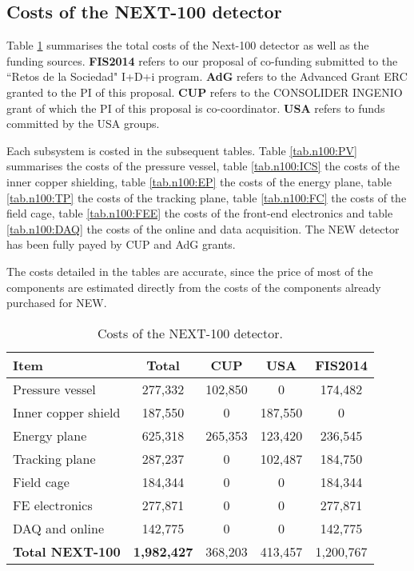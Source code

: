 \subsection{Costs of the NEXT-100 detector}
Table \ref{tab.n100:DET} summarises the total costs of the Next-100 detector as well as the funding sources. {\bf FIS2014} refers to our proposal of co-funding submitted to the ``Retos de la Sociedad" I+D+i program. {\bf AdG} refers to the Advanced Grant ERC granted to the PI of this proposal. {\bf CUP} refers to the CONSOLIDER INGENIO grant of which the PI of this proposal is co-coordinator. {\bf USA} refers to funds committed by the USA groups.

Each subsystem is costed in the subsequent tables. Table \ref{tab.n100:PV} summarises the costs of the pressure vessel, 
table \ref{tab.n100:ICS} the costs of the inner copper shielding,
table \ref{tab.n100:EP} the costs of the energy plane,
table \ref{tab.n100:TP} the costs of the tracking plane,
table \ref{tab.n100:FC} the costs of the field cage,
table \ref{tab.n100:FEE} the costs of the front-end electronics and
table \ref{tab.n100:DAQ} the costs of the online and data acquisition. The NEW detector has
been fully payed by CUP and AdG grants.

The costs detailed in the tables are  accurate, since the price of most of the components are estimated directly from the costs of the components already purchased for NEW. 
  
\begin{table}[h!]
\begin{center}
\begin{tabular}{|l|c|c|c|c|}
\hline
 Item &	Total& 	CUP & USA & FIS2014 \\
 \hline
Pressure vessel &	277,332 & 102,850  & 0&	174,482  \\
Inner copper shield &	187,550 &	0 & 187,550 & 0 \\
Energy plane	& 625,318 &	265,353	&	123,420	&	236,545 \\
Tracking plane	& 287,237 &	0 & 102,487	& 184,750 \\
Field cage	& 184,344 &	0	& 0	&	184,344 \\
FE electronics	& 277,871 &	0 &	0 &	277,871 \\
DAQ and online &	142,775 & 	0	& 0	& 142,775 \\
 \hline
{\bf Total NEXT-100} &	{\bf1,982,427 }& 368,203& 	413,457 & 	1,200,767 \\	
 \hline\hline
\end{tabular}  
\caption{Costs of the NEXT-100 detector.}
\label{tab.n100:DET}
\end{center}
\end{table} 

